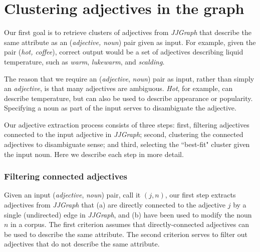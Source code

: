 \documentclass[11pt,a4paper]{article}
\begin{document}
	


\section{Clustering adjectives in the graph}

Our first goal is to retrieve clusters of adjectives from \textit{JJGraph} that describe the same attribute as an (\textit{adjective, noun}) pair given as input. For example, given the pair (\textit{hot, coffee}), correct output would be a set of adjectives describing liquid temperature, such as \textit{warm}, \textit{lukewarm}, and \textit{scalding}.

The reason that we require an (\textit{adjective}, \textit{noun}) pair as input, rather than simply an \textit{adjective}, is that many adjectives are ambiguous. \textit{Hot}, for example, can describe temperature, but can also be used to describe appearance or popularity. Specifying a noun as part of the input serves to disambiguate the adjective.

Our adjective extraction process consists of three steps: first, filtering adjectives connected to the input adjective in \textit{JJGraph}; second, clustering the connected adjectives to disambiguate sense; and third, selecting the ``best-fit" cluster given the input noun. Here we describe each step in more detail.

\subsubsection{Filtering connected adjectives}

Given an input (\textit{adjective}, \textit{noun}) pair, call it $(j,n)$, our first step extracts adjectives from \textit{JJGraph} that (a) are directly connected to the adjective $j$ by a single (undirected) edge in \textit{JJGraph}, and (b) have been used to modify the noun $n$ in a corpus. The first criterion assumes that directly-connected adjectives can be used to describe the same attribute. The second criterion serves to filter out adjectives that do not describe the same attribute.
\end{document}
